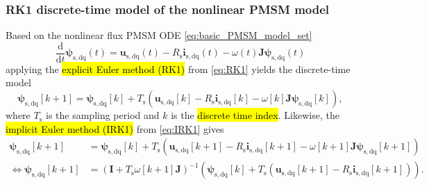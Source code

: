 \begin{frame}
    \frametitle{RK1 discrete-time model of the nonlinear PMSM model}
    Based on the nonlinear flux PMSM ODE \eqref{eq:basic_PMSM_model_set}
    \begin{equation*}
        \frac{\mathrm{d}}{\mathrm{d}t}\bm{\psi}_\mathrm{s,dq}(t)  = \bm{u}_\mathrm{s,dq}(t) - R_\mathrm{s} \bm{i}_\mathrm{s,dq}(t)- \omega(t)\bm{J}\bm{\psi}_\mathrm{s,dq}(t)
    \end{equation*}\pause
    applying the \hl{explicit Euler method (RK1)} from \eqref{eq:RK1} yields the discrete-time model
    \begin{equation}
        \bm{\psi}_\mathrm{s,dq}[k+1] = \bm{\psi}_\mathrm{s,dq}[k] + T_\mathrm{s}\left(\bm{u}_\mathrm{s,dq}[k] - R_\mathrm{s} \bm{i}_\mathrm{s,dq}[k]- \omega[k]\bm{J}\bm{\psi}_\mathrm{s,dq}[k]\right),
        \label{eq:RK1_dq_flux_linkage_PMSM}
    \end{equation}
    where $T_\mathrm{s}$ is the sampling period and $k$ is the \hl{discrete time index}. \pause Likewise, the \hl{implicit Euler method (IRK1)} from \eqref{eq:IRK1} gives
    \begin{equation}
        \begin{split}
            \bm{\psi}_\mathrm{s,dq}[k+1]                 & = \bm{\psi}_\mathrm{s,dq}[k] + T_\mathrm{s}\left(\bm{u}_\mathrm{s,dq}[k+1] - R_\mathrm{s} \bm{i}_\mathrm{s,dq}[k+1]- \omega[k+1]\bm{J}\bm{\psi}_\mathrm{s,dq}[k+1]\right)                        \\
            \Leftrightarrow \bm{\psi}_\mathrm{s,dq}[k+1] & = \left(\bm{I} + T_\mathrm{s}\omega[k+1]\bm{J}\right)^{-1}\left(\bm{\psi}_\mathrm{s,dq}[k] + T_\mathrm{s}\left(\bm{u}_\mathrm{s,dq}[k+1] - R_\mathrm{s} \bm{i}_\mathrm{s,dq}[k+1]\right)\right).
        \end{split}
        \label{eq:IRK1_nonlinear_flux_ODE_PMSM}
    \end{equation}
\end{frame}


